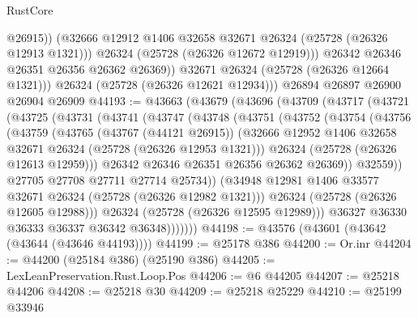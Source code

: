 \begin{lexlean}{RustCore}
\begin{coremodule}
                  @26915))
              (@32666 @12912 @1406 @32658 @32671 @26324 (@25728 (@26326 @12913 @1321)))
              @26324
              (@25728 (@26326 @12672 @12919)))
            @26342
            @26346
            @26351
            @26356
            @26362
            @26369))
        @32671
        @26324
        (@25728 (@26326 @12664 @1321)))
      @26324
      (@25728 (@26326 @12621 @12934)))
    @26894
    @26897
    @26900
    @26904
    @26909
@44193 := @43663
    (@43679
      (@43696
        (@43709
          (@43717
            (@43721
              (@43725
                (@43731
                  (@43741
                    (@43747
                      (@43748
                        (@43751
                          (@43752
                            (@43754
                              (@43756
                                (@43759
                                  (@43765
                                    (@43767 (@44121 @26915))
                                    (@32666
                                      @12952
                                      @1406
                                      @32658
                                      @32671
                                      @26324
                                      (@25728 (@26326 @12953 @1321)))
                                    @26324
                                    (@25728 (@26326 @12613 @12959)))
                                  @26342
                                  @26346
                                  @26351
                                  @26356
                                  @26362
                                  @26369))
                              @32559))
                          @27705
                          @27708
                          @27711
                          @27714
                          @25734))
                      (@34948 @12981 @1406 @33577 @32671 @26324 (@25728 (@26326 @12982 @1321)))
                      @26324
                      (@25728 (@26326 @12605 @12988)))
                    @26324
                    (@25728 (@26326 @12595 @12989)))
                  @36327
                  @36330
                  @36333
                  @36337
                  @36342
                  @36348)))))))
@44198 := @43576 (@43601 (@43642 (@43644 (@43646 @44193))))
@44199 := @25178 @386
@44200 := Or.inr
@44204 := @44200 (@25184 @386) (@25190 @386)
@44205 := LexLeanPreservation.Rust.Loop.Pos
@44206 := @6 @44205
@44207 := @25218 @44206
@44208 := @25218 @30
@44209 := @25218 @25229
@44210 := @25199 @33946

\end{coremodule}
\end{lexlean}
